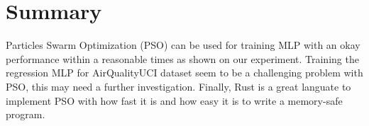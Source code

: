 \documentclass{article}
\begin{document}
\section*{Summary}
Particles Swarm Optimization (PSO) can be used for training MLP with an okay performance within a reasonable times as shown on our
experiment. Training the regression MLP for AirQualityUCI dataset seem to be a challenging problem with PSO, this may need a further
investigation. 
Finally, Rust is a great languate to implement PSO with how fast it is and how easy it is to write a memory-safe program.

\printbibliography


\end{document}
